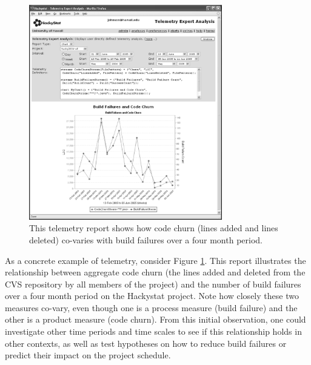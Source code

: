 \begin{figure}[ht]
  \centering
  \includegraphics[width=0.75\textwidth]{BuildAndChurn.eps}
  \caption{This telemetry report shows how code churn (lines
  added and lines deleted) co-varies with build failures over a four month period.} 
  \label{fig:telemetryreport}
\end{figure}

As a concrete example of telemetry, consider Figure
\ref{fig:telemetryreport}. This report illustrates the relationship between
aggregate code churn (the lines added and deleted from the CVS repository
by all members of the project) and the number of build failures
over a four month period on the Hackystat project. Note how closely these
two measures co-vary, even though one is a process measure (build failure)
and the other is a product measure (code churn).  From this initial
observation, one could investigate other time periods and time scales to
see if this relationship holds in other contexts, as well as test
hypotheses on how to reduce build failures or predict their impact on the
project schedule.

